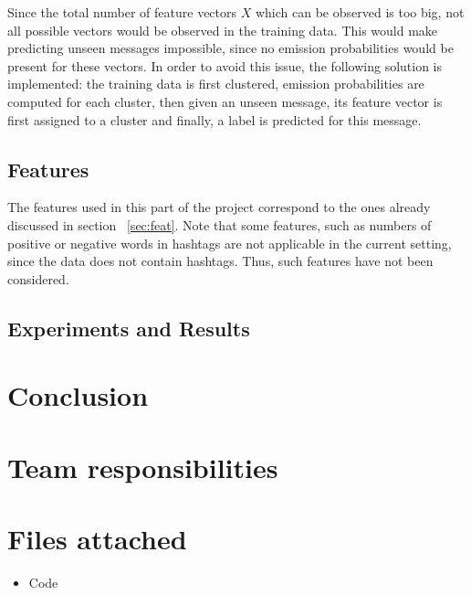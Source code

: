 \documentclass{article}
\begin{document}
\noindent Since the total number of feature vectors $X$ which can be observed is too big, not all possible vectors would be observed in the training data. This would make predicting unseen messages impossible, since no emission probabilities would be present for these vectors. In order to avoid this issue, the following solution is implemented: the training data is first clustered, emission probabilities are computed for each cluster, then given an unseen message, its feature vector is first assigned to a cluster and finally, a label is predicted for this message. \\

\noindent 


\subsection{Features}

The features used in this part of the project correspond to the ones already discussed in section ~\ref{sec:feat}. Note that some features, such as numbers of positive or negative words in hashtags are not applicable in the current setting, since the data does not contain hashtags. Thus, such features have not been considered. 


\subsection{Experiments and Results}

\pagebreak



\section{Conclusion}




\section{Team responsibilities}


\section*{Files attached}
\begin{itemize}
\item Code
\end{itemize}
\end{document}
